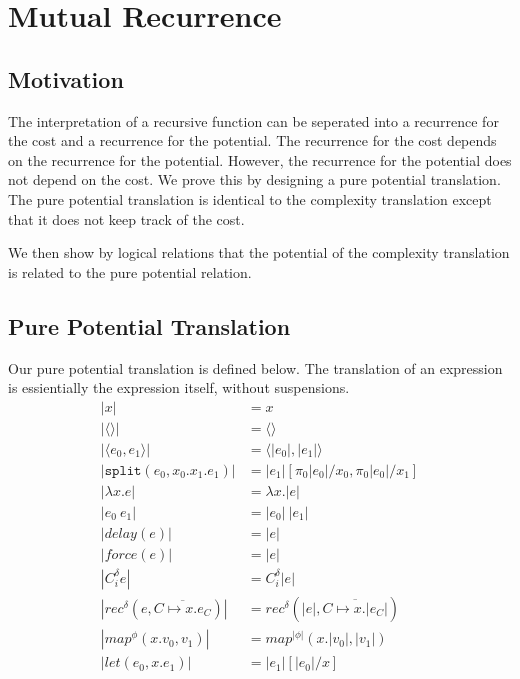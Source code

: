 \chapter{Mutual Recurrence}

\section{Motivation}
The interpretation of a recursive function can be seperated into a recurrence
for the cost and a recurrence for the potential. The recurrence for the cost
depends on the recurrence for the potential. However, the recurrence for the
potential does not depend on the cost. We prove this by designing a pure
potential translation. The pure potential translation is identical to the
complexity translation except that it does not keep track of the cost.

We then show by logical relations that the potential of the complexity
translation is related to the pure potential relation.

\section{Pure Potential Translation}
Our pure potential translation is defined below. The translation of an
expression is essientially the expression itself, without suspensions.
%
\begin{align*}
  |x| &= x                                                                                     \\
  |\langle\rangle| &= \langle\rangle                                                           \\
  |\langle e_0, e_1 \rangle | &= \langle |e_0|, |e_1| \rangle                                  \\
  |\texttt{split}(e_0, x_0. x_1. e_1)| &= |e_1|[\pi_0|e_0|/x_0, \pi_0|e_0|/x_1]                \\
  |\lambda x.e | &= \lambda x.|e|                                                              \\
  |e_0\ e_1| &= |e_0|\ |e_1|                                                                   \\
  |delay(e)| &= |e|                                                                            \\
  |force(e)| &= |e|                                                                            \\
  |C_i^\delta e| &= C_i^\delta |e|                                                             \\
  |rec^\delta(e, \overline{C \mapsto x.e_C})| &= rec^\delta(|e|, \overline{C \mapsto x.|e_C|}) \\
  |map^\phi(x.v_0, v_1)| &= map^{|\phi|}(x.|v_0|, |v_1|)                                       \\
  |let(e_0, x.e_1)| &= |e_1|[|e_0|/x]
\end{align*}
%
